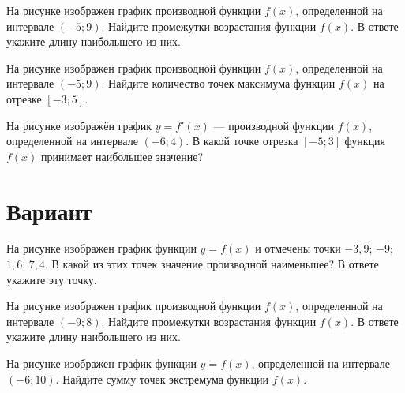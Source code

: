 \begin{taskBN}{2}
На рисунке изображен график производной функции $f(x)$, определенной на интервале $(-5;9)$. Найдите промежутки возрастания функции $f(x)$. В ответе укажите длину наибольшего из них.
\end{taskBN}

\begin{taskBN}{3}
На рисунке изображен график производной функции $f(x)$, определенной на интервале $(-5;9)$. Найдите количество точек максимума функции $f(x)$ на отрезке $[-3;5]$. 
\end{taskBN}

\begin{taskBN}{4}
На рисунке изображён график $y=f'(x)$ — производной функции $f(x)$, определенной на интервале $(-6;4)$. В какой точке отрезка $[-5; 3]$ функция $f(x)$ принимает наибольшее значение?
\end{taskBN}

\newpage\section{Вариант}\begin{taskBN}{1}
На рисунке изображен график функции $y=f(x)$ и отмечены точки $-3,9$; $-9$; $1,6$; $7,4$. В какой из этих точек значение производной наименьшее? В ответе укажите эту точку. 
\end{taskBN}

\begin{taskBN}{2}
На рисунке изображен график производной функции $f(x)$, определенной на интервале $(-9;8)$. Найдите промежутки возрастания функции $f(x)$. В ответе укажите длину наибольшего из них.
\end{taskBN}

\begin{taskBN}{3}
На рисунке изображен график функции $y=f(x)$, определенной на интервале $(-6;10)$. Найдите сумму точек экстремума функции $f(x)$.
\end{taskBN}

